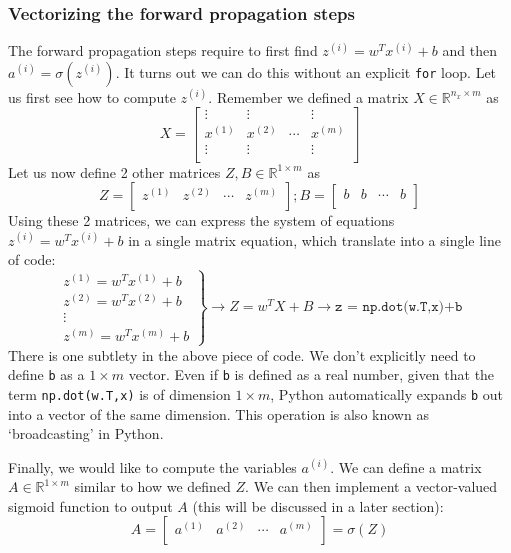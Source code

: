 \documentclass{article}[a4paper,12pt]
\theoremstyle{definition}
\begin{document}
\subsubsection{Vectorizing the forward propagation steps}
The forward propagation steps require to first find $z^{(i)}=w^Tx^{(i)}+b$ and then $a^{(i)}=\sigma(z^{(i)})$. It turns out we can do this without an explicit \texttt{for} loop. Let us first see how to compute $z^{(i)}$. Remember we defined a matrix $X\in\mathbb{R}^{n_x\times m}$ as
$$X=\begin{bmatrix}
	\vdots & \vdots & & \vdots\\
	x^{(1)} & x^{(2)} & \cdots & x^{(m)}\\
	\vdots & \vdots & & \vdots\\
\end{bmatrix}$$
Let us now define 2 other matrices $Z,B\in\mathbb{R}^{1\times m}$ as
$$Z=\begin{bmatrix}
	z^{(1)} & z^{(2)} & \cdots & z^{(m)}\\
\end{bmatrix};
B=\begin{bmatrix}
	b & b & \cdots & b\\
\end{bmatrix}$$
Using these 2 matrices, we can express the system of equations $z^{(i)}=w^Tx^{(i)}+b$ in a single matrix equation, which translate into a single line of code:
$$\left. \begin{array}{cc}
    z^{(1)}=w^Tx^{(1)}+b \\
    z^{(2)}=w^Tx^{(2)}+b \\
    \vdots \\
    z^{(m)}=w^Tx^{(m)}+b
\end{array}{} \right\}
\longrightarrow Z = w^TX+B \longrightarrow \texttt{z = np.dot(w.T,x)+b}
$$
There is one subtlety in the above piece of code. We don't explicitly need to define \texttt{b} as a $1\times m$ vector. Even if \texttt{b} is defined as a real number, given that the term \texttt{np.dot(w.T,x)} is of dimension $1\times m$, Python automatically expands \texttt{b} out into a vector of the same dimension. This operation is also known as `broadcasting' in Python.
\vspace{6pt}

Finally, we would like to compute the variables $a^{(i)}$. We can define a matrix $A\in\mathbb{R}^{1\times m}$ similar to how we defined $Z$. We can then implement a vector-valued sigmoid function to output $A$ (this will be discussed in a later section):
$$A=\begin{bmatrix}
	a^{(1)} & a^{(2)} & \cdots & a^{(m)}\\
\end{bmatrix}=\sigma(Z)$$
\end{document}
